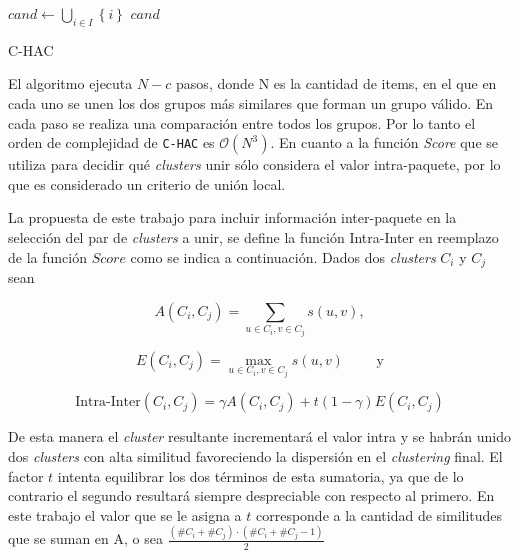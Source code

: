 \begin{algorithm}[H]
\DontPrintSemicolon
\SetAlgoLined
	$cand \leftarrow \bigcup_{i \in I}\left\{i\right\}$\;
	\Return $cand$\;
\caption{C-HAC}\label{alg:C-HAC}
\end{algorithm}

El algoritmo ejecuta $N - c$ pasos, donde N es la cantidad de items, en el que en cada uno se unen los dos grupos más similares que forman un grupo válido. En cada paso se realiza una comparación entre todos los grupos. Por lo tanto el orden de complejidad de \texttt{C-HAC} es $\mathcal{O}(N^{3})$. En cuanto a la función \textit{Score} que se utiliza para decidir qué {\em clusters} unir sólo considera el valor intra-paquete, por lo que es considerado un criterio de unión local.

La propuesta de este trabajo para incluir información inter-paquete en la selección del par de {\em clusters} a unir, se define la función Intra-Inter en reemplazo de la función $Score$ como se indica a continuación. Dados dos {\em clusters} $C_i$ y $C_j$ sean

$$A(C_i,C_j) = \sum_{u \in C_i, v \in C_j}{s(u,v)},$$

$$E(C_i,C_j)=\max_{u \in C_i, v \in C_j}{s(u,v)} \qquad \mbox{ y}$$

$$\mbox{Intra-Inter}(C_i,C_j) = \gamma A(C_i,C_j) + t (1-\gamma) E(C_i,C_j)$$

De esta manera el {\em cluster} resultante incrementará el valor intra y se habrán unido dos {\em clusters} con alta similitud favoreciendo la dispersión en el {\em clustering} final. El factor $t$ intenta equilibrar los dos términos de esta sumatoria, ya que de lo contrario el segundo resultará siempre despreciable con respecto al primero. En este trabajo el valor que se le asigna a $t$ corresponde a la cantidad de similitudes que se suman en A, o sea $\frac{(\#C_i + \#C_j) \cdot (\#C_i + \#C_j - 1)}{2}$  

